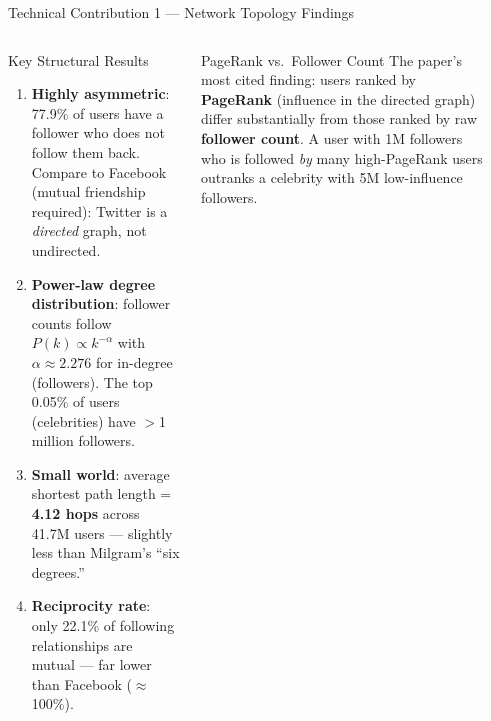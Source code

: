 \documentclass[aspectratio=169,10pt]{beamer}
\begin{document}
\begin{frame}{Technical Contribution 1 — Network Topology Findings}
  \begin{columns}[T]
      \begin{block}{Key Structural Results}
        \begin{enumerate}
          \item \textbf{Highly asymmetric}: 77.9\% of users
                have a follower who does not follow them back.
                Compare to Facebook (mutual friendship required):
                Twitter is a \emph{directed} graph, not undirected.
          \item \textbf{Power-law degree distribution}: follower
                counts follow $P(k) \propto k^{-\alpha}$ with
                $\alpha \approx 2.276$ for in-degree (followers).
                The top 0.05\% of users (celebrities) have
                $>$1 million followers.
          \item \textbf{Small world}: average shortest path
                length = \textbf{4.12 hops} across 41.7M users —
                slightly less than Milgram's ``six degrees.''
          \item \textbf{Reciprocity rate}: only 22.1\% of
                following relationships are mutual — far lower
                than Facebook ($\approx$100\%).
        \end{enumerate}
      \end{block}
      \vspace{4pt}
      \begin{exampleblock}{PageRank vs.\ Follower Count}
        The paper's most cited finding: users ranked by
        \textbf{PageRank} (influence in the directed graph)
        differ substantially from those ranked by raw
        \textbf{follower count}.
        A user with 1M followers who is followed \emph{by}
        many high-PageRank users outranks a celebrity with
        5M low-influence followers.
      \end{exampleblock}

      \begin{center}
\end{center}
\end{columns}
\end{frame}
\end{document}
